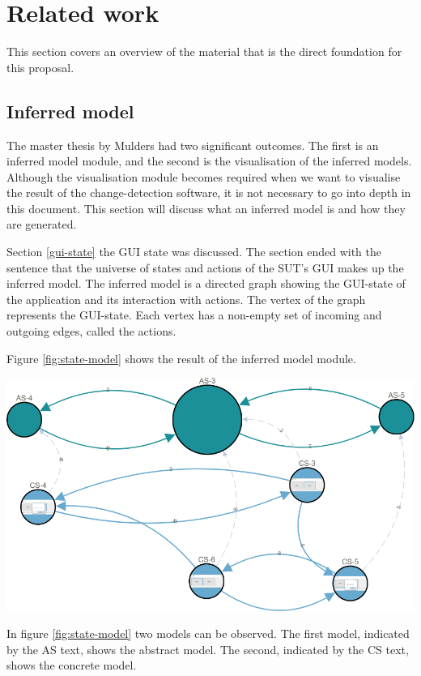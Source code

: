 \section{Related work} \label{releatedWork}
This section covers an overview of the material that is the direct foundation for this proposal.

\subsection{Inferred model} \label{inferred-model}
The master thesis by Mulders had two significant outcomes. The first is an inferred model module, and the second is the visualisation of the inferred models. Although the visualisation module becomes required when we want to visualise the result of the change-detection software, it is not necessary to go into depth in this document. This section will discuss what an inferred model is and how they are generated. 

Section \ref{gui-state} the GUI state was discussed. The section ended with the sentence that the universe of states and actions of the SUT's GUI makes up the inferred model. The inferred model is a directed graph showing the GUI-state of the application and its interaction with actions. The vertex of the graph represents the GUI-state. Each vertex has a non-empty set of incoming and outgoing edges, called the actions. 

Figure \ref{fig:state-model} shows the result of the inferred model module.

\bigskip
\begingroup
\captionsetup{type=figure}
\includegraphics[scale=0.6]{pics/state-model.png}
\label{fig:state-model}
\endgroup

In figure \ref{fig:state-model} two models can be observed. The first model, indicated by the AS text, shows the abstract model. The second, indicated by the CS text, shows the concrete model. 


